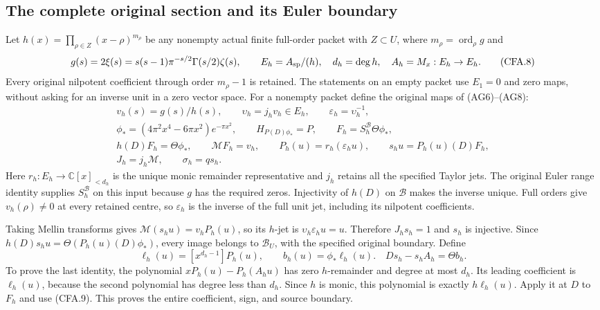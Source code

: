 \subsection{The complete original section and its Euler boundary}

Let $h(x)=\prod_{\rho\in Z}(x-\rho)^{m_\rho}$ be any nonempty actual
finite full-order packet with $Z\subset U$, where
$m_\rho=\operatorname{ord}_\rho g$ and
\[
 g(s)=2\xi(s)=s(s-1)\pi^{-s/2}\Gamma(s/2)\zeta(s),\qquad
 E_h=A_{\rm sp}/(h),\quad d_h=\deg h,
 \quad A_h=M_x:E_h\to E_h.                                  \tag{CFA.8}
\]
Every original nilpotent coefficient through order $m_\rho-1$ is
retained.  The statements on an empty packet use $E_1=0$ and zero
maps, without asking for an inverse unit in a zero vector space.
For a nonempty packet define the original maps of (AG6)--(AG8):
\[
\begin{gathered}
 v_h(s)=g(s)/h(s),\qquad \upsilon_h=j_hv_h\in E_h,
 \qquad\varepsilon_h=\upsilon_h^{-1},\\
 \phi_*=(4\pi^2x^4-6\pi x^2)e^{-\pi x^2},\qquad
 H_{P(D)\phi_*}=P,\qquad F_h=S_h^{\mathscr B}\Theta\phi_*,\\
 h(D)F_h=\Theta\phi_*,\qquad \mathcal MF_h=v_h,\qquad
 P_h(u)=r_h(\varepsilon_hu),\qquad s_hu=P_h(u)(D)F_h,\\
 J_h=j_h\mathcal M,\qquad \sigma_h=q s_h.
\end{gathered}                                                 \tag{CFA.9}
\]
Here $r_h:E_h\to\mathbb C[x]_{<d_h}$ is the unique monic remainder
representative and $j_h$ retains all the specified Taylor jets.
The original Euler range identity supplies $S_h^{\mathscr B}$ on
this input because $g$ has the required zeros.  Injectivity of $h(D)$
on $\mathscr B$ makes the inverse unique.  Full orders give
$v_h(\rho)\ne0$ at every retained centre, so $\varepsilon_h$ is the
inverse of the full unit jet, including its nilpotent coefficients.

Taking Mellin transforms gives
$\mathcal M(s_hu)=v_h P_h(u)$, so its $h$-jet is
$\upsilon_h\varepsilon_hu=u$.  Therefore $J_hs_h=1$ and $s_h$ is
injective.  Since $h(D)s_hu=\Theta(P_h(u)(D)\phi_*)$, every image
belongs to $\mathscr B_U$, with the specified original boundary.
Define
\[
 \ell_h(u)=[x^{d_h-1}]P_h(u),\qquad b_h(u)=\phi_*\ell_h(u).
 \quad
 Ds_h-s_hA_h=\Theta b_h.                                    \tag{CFA.10}
\]
To prove the last identity, the polynomial
$xP_h(u)-P_h(A_hu)$ has zero $h$-remainder and degree at most $d_h$.
Its leading coefficient is $\ell_h(u)$, because the second polynomial
has degree less than $d_h$.  Since $h$ is monic, this polynomial is
exactly $h\ell_h(u)$.  Apply it at $D$ to $F_h$ and use (CFA.9).
This proves the entire coefficient, sign, and source boundary.

